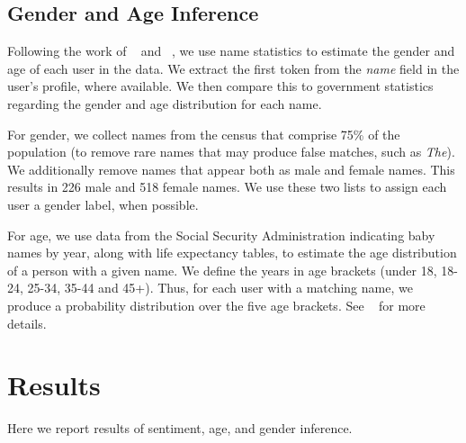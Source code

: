 \documentclass{sig-alternate}
\newcommand{\citenoun}[1]{{\citeauthor{#1}~\cite{#1}}}
\begin{document}
\subsection{Gender and Age Inference}

Following the work of \citenoun{paval2015confounds} and
\citenoun{silver2014how}, we use name statistics to estimate the gender and
age of each user in the data. We extract the first token from the {\it name} field in the user's profile, where available. We then compare this to government statistics regarding the gender and age distribution for each name.

For gender, we collect names from the census that comprise 75\% of the
population (to remove rare names that may produce false matches, such as {\it
  The}). We additionally remove names that appear both as male and female
names. This results in 226 male and 518 female names. We use these two lists to assign each user a gender label, when possible.

For age, we use data from the Social Security Administration indicating baby names by year, along with life expectancy tables, to estimate the age distribution of a person with a given name. We define the years in age brackets (under 18, 18-24, 25-34, 35-44 and 45+). Thus, for each user with a matching name, we produce a probability distribution over the five age brackets. See \citenoun{silver2014how} for more details.

\section{Results}
\label{s.results}

Here we report results of sentiment, age, and gender inference.
\end{document}
